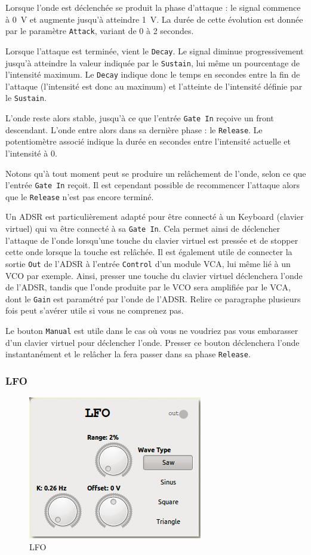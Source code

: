 \documentclass[a4paper,oneside,frenchb,12pt]{article}
\begin{document}
Lorsque l'onde est déclenchée se produit la phase d'attaque : le signal
commence à 0~V et augmente jusqu'à atteindre 1~V. La durée de cette
évolution est donnée par le paramètre \verb!Attack!, variant de 0 à 2
secondes.

Lorsque l'attaque est terminée, vient le \verb!Decay!. Le signal diminue
progressivement jusqu'à atteindre la valeur indiquée par le
\verb!Sustain!, lui même un pourcentage de l'intensité maximum. Le
\verb!Decay! indique donc le temps en secondes entre la fin de l'attaque
(l'intensité est donc au maximum) et l'atteinte de l'intensité définie
par le \verb!Sustain!.

L'onde reste alors stable, jusqu'à ce que l'entrée \verb!Gate In!
reçoive un front descendant. L'onde entre alors dans sa dernière phase :
le \verb!Release!. Le potentiomètre associé indique la durée en secondes
entre l'intensité actuelle et l'intensité à 0.

Notons qu'à tout moment peut se produire un relâchement de l'onde, selon
ce que l'entrée \verb!Gate In! reçoit. Il est cependant possible de
recommencer l'attaque alors que le \verb!Release! n'est pas encore
terminé.

Un ADSR est particulièrement adapté pour être connecté à un Keyboard
(clavier virtuel) qui va être connecté à sa \verb!Gate In!. Cela permet
ainsi de déclencher l'attaque de l'onde lorsqu'une touche du clavier
virtuel est pressée et de stopper cette onde lorsque la touche est
relâchée. Il est également utile de connecter la sortie \verb!Out! de
l'ADSR à l'entrée \verb!Control! d'un module VCA, lui même lié à un VCO
par exemple. Ainsi, presser une touche du clavier virtuel déclenchera
l'onde de l'ADSR, tandis que l'onde produite par le VCO sera amplifiée
par le VCA, dont le \verb!Gain! est paramétré par l'onde de l'ADSR.
Relire ce paragraphe plusieurs fois peut s'avérer utile si vous ne
comprenez pas.

Le bouton \verb!Manual! est utile dans le cas où vous ne voudriez pas
vous embarasser d'un clavier virtuel pour déclencher l'onde. Presser ce
bouton déclenchera l'onde instantanément et le relâcher la fera passer
dans sa phase \verb!Release!.

\subsubsection{LFO}

\begin{figure}[h!]
\centering
\includegraphics[scale=0.5]{../img/png/lfo.png}
\caption{LFO}
\end{figure}
\end{document}
